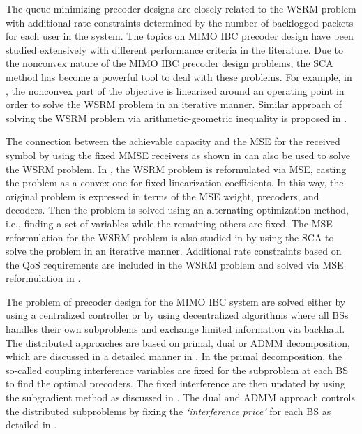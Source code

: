 The queue minimizing precoder designs are closely related to the \ac{WSRM} problem with additional rate constraints determined by the number of backlogged packets for each user in the system. The topics on \ac{MIMO} \ac{IBC} precoder design have been studied extensively with different performance criteria in the literature. Due to the nonconvex nature of the \ac{MIMO} \ac{IBC} precoder design problems, the \ac{SCA} method has become a powerful tool to deal with these problems. For example, in \cite{sin_algorithm}, the nonconvex part of the objective is linearized around an operating point in order to solve the \ac{WSRM} problem in an iterative manner. Similar approach of solving the \ac{WSRM} problem via arithmetic-geometric inequality is proposed in \cite{tran2012fast}.

The connection between the achievable capacity and the \ac{MSE} for the received symbol by using the fixed \ac{MMSE} receivers as shown in \cite{viswanath1999optimal,mse_duality} can also be used to solve the \ac{WSRM} problem. In \cite{christensen2008weighted,wmmse_shi}, the \ac{WSRM} problem is reformulated via \ac{MSE}, casting the problem as a convex one for fixed linearization coefficients. In this way, the original problem is expressed in terms of the \ac{MSE} weight, precoders, and decoders. Then the problem is solved using an alternating optimization method, i.e., finding a set of variables while the remaining others are fixed. The \ac{MSE} reformulation for the \ac{WSRM} problem is also studied in \cite{hong2012decomposition} by using the \ac{SCA} to solve the problem in an iterative manner. Additional rate constraints based on the \ac{QoS} requirements are included in the \ac{WSRM} problem and solved via \ac{MSE} reformulation in \cite{kaleva2013primal}.

The problem of precoder design for the \ac{MIMO} \ac{IBC} system are solved either by using a centralized controller or by using decentralized algorithms where all \acp{BS} handles their own subproblems and exchange limited information via backhaul. The distributed approaches are based on primal, dual or \ac{ADMM} decomposition, which are discussed in a detailed manner in \cite{palomar2006tutorial,boyd2011distributed}. In the  primal decomposition, the so-called coupling interference variables are fixed for the subproblem at each \ac{BS} to find the optimal precoders. The fixed interference are then updated by using the subgradient method as discussed in \cite{pennanen2011decentralized}. The dual and \ac{ADMM} approach controls the distributed subproblems by fixing the \emph{`interference price'} for each \ac{BS} as detailed in \cite{tolli2011decentralized}.

